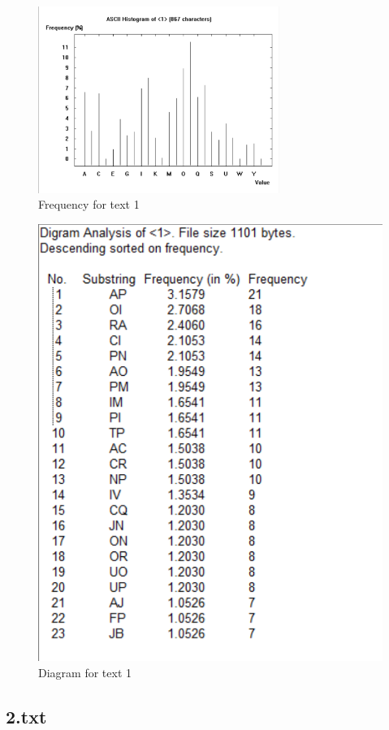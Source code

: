 \begin{figure}[ht!]
    \begin{center}
        \includegraphics[width=0.7\textwidth]{assets/1_frequency.png}
        \caption{Frequency for text 1}
        \label{fig:1freq}
    \end{center}
\end{figure}

\begin{figure}[ht!]
    \begin{center}
        \includegraphics[height=0.8\textwidth]{assets/1_diagram.png}
        \caption{Diagram for text 1}
        \label{fig:1diagram}
    \end{center}
\end{figure}

\newpage
\subsection*{2.txt}

